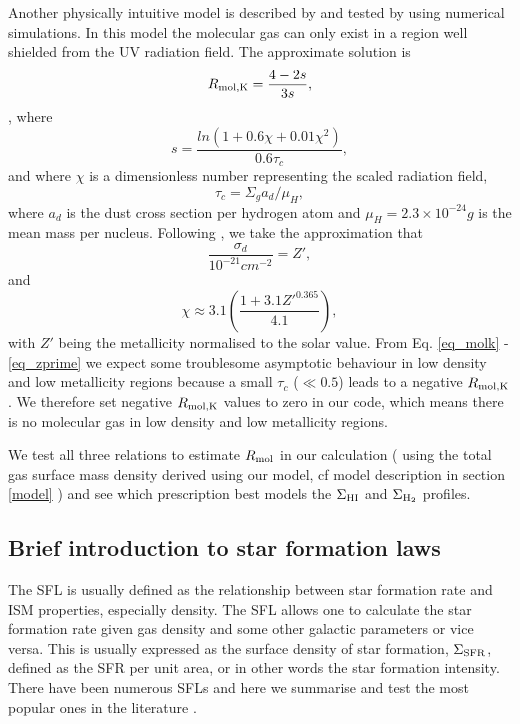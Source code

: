 \documentclass[12pt,preprint]{aastex}
\begin{document}
Another  physically intuitive model is described by \citet[hereafter KR relation or $R_{\rm mol,K}$]{kru08, kru09a, kru09} and tested by \citet{kru11} using numerical simulations. In this model the molecular gas can only exist in a region well shielded from the UV radiation field. The approximate solution is 
\begin{equation}
R_{\rm mol,K}=\frac{4-2s}{3s},
\label{eq_molk}
\end{equation} 
\citep{kru11}, where 
\begin{equation}
s=\frac{ln(1+0.6\chi+0.01\chi^2)}{0.6 \tau_c},
\label{eq_s}
\end{equation}
and where $\chi$ is a dimensionless number representing the scaled radiation field, 
\begin{equation}
\tau_c=\Sigma_g a_d/\mu_H,  
\end{equation}
where $a_d$ is the dust cross section per hydrogen atom and $\mu_H=2.3\times10^{-24}g$ is the mean mass per nucleus. Following \citet{kru11}, we take the approximation that 
\begin{equation}
\frac{\sigma_{d}}{10^{-21} cm^{-2}}=Z', 
\label{eq_crosssection}
\end{equation}
and 
\begin{equation}
\chi \approx 3.1 \left( \frac{1+3.1 Z'^{0.365}}{4.1} \right),
\label{eq_zprime}
\end{equation}
with $Z'$ being the metallicity normalised to the solar value. From Eq. \ref{eq_molk} - \ref{eq_zprime} we expect some troublesome asymptotic behaviour in low density and low metallicity regions because a small $\tau_c$ ($\ll 0.5$) leads to a negative $R_{\rm mol,K}$. We therefore set negative $R_{\rm mol,K}$  values to zero in our code, which means there is no molecular gas in low density and low metallicity regions.

We test all three relations to estimate $R_{\rm mol}$ in our calculation ( using the total gas surface mass density derived using our model, cf model description in section \ref{model} ) and see which prescription best models the $\Sigma_{\rm HI}$ and $\Sigma_{\rm H_2}$ profiles. 



\subsection{Brief introduction to star formation laws}
The SFL is usually defined as the relationship between star formation rate and ISM properties, especially density. The SFL allows one to calculate the star formation rate given gas density and some other galactic parameters or vice versa. 
This is usually expressed as the surface density of star formation, $\Sigma_{\rm SFR}$, defined as the SFR per unit area, or in other words the star formation intensity.
There have been numerous SFLs and here we summarise and test the most popular ones in the literature \citep[L08;][and references therein]{big08,tan10}.
\end{document}
